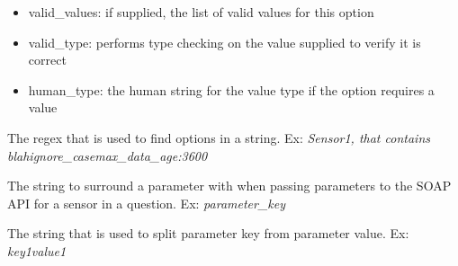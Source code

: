 \documentclass[letterpaper,10pt,english]{sphinxmanual}
\begin{document}
\begin{fulllineitems}
\begin{description}
\begin{itemize}
\item {} 
valid\_values: if supplied, the list of valid values for this option

\item {} 
valid\_type: performs type checking on the value supplied to verify it is correct

\item {} 
human\_type: the human string for the value type if the option requires a value

\end{itemize}

\end{description}

\end{fulllineitems}


\begin{fulllineitems}
\label{pytan.constants:pytan.constants.OPTION_RE}
The regex that is used to find options in a string. Ex: \emph{Sensor1, that contains blah}\emph{ignore\_case}\emph{max\_data\_age:3600}

\end{fulllineitems}


\begin{fulllineitems}
\label{pytan.constants:pytan.constants.PARAM_DELIM}
The string to surround a parameter with when passing parameters to the SOAP API for a sensor in a question. Ex: \code{\textbar{}\textbar{}}\emph{parameter\_key}\code{\textbar{}\textbar{}}

\end{fulllineitems}


\begin{fulllineitems}
\label{pytan.constants:pytan.constants.PARAM_KEY_SPLIT}
The string that is used to split parameter key from parameter value. Ex: \emph{key1}\code{=}\emph{value1}

\end{fulllineitems}
\end{document}

